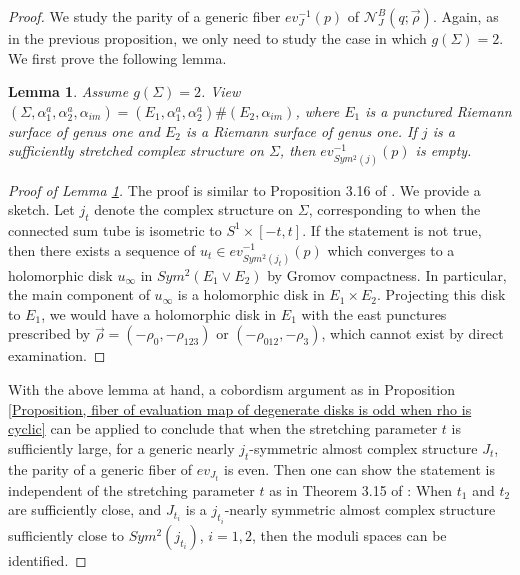 \documentclass{amsart}
\newtheorem{lem}[thm]{Lemma}
\theoremstyle{definition}
\theoremstyle{remark}
\numberwithin{equation}{section}
\numberwithin{equation}{section} \makeatletter
\begin{document}
\begin{proof}
We study the parity of a generic fiber $ev^{-1}_J(p)$ of $\mathcal{N}_J^B(q;\overrightarrow{\rho})$. Again, as in the previous proposition, we only need to study the case in which $g(\Sigma)=2$. We first prove the following lemma. 
\begin{lem}\label{Lemma, fiber of degenerate disk over sufficiently stretched complex structure, rho non-cyclic}
Assume $g(\Sigma)=2$. View $(\Sigma,\alpha_1^a,\alpha^a_2,\alpha_{im})=(E_1,\alpha_1^a,\alpha_2^a)\# (E_2,\alpha_{im})$, where $E_1$ is a punctured Riemann surface of genus one and $E_2$ is a Riemann surface of genus one. If $j$ is a sufficiently stretched complex structure on $\Sigma$, then $ev^{-1}_{Sym^2(j)}(p)$ is empty.
\end{lem}  
\begin{proof}[Proof of Lemma \ref{Lemma, fiber of degenerate disk over sufficiently stretched complex structure, rho non-cyclic}]
The proof is similar to Proposition 3.16 of \cite{OS04}. We provide a sketch. Let $j_t$ denote the complex structure on $\Sigma$, corresponding to when the connected sum tube is isometric to $S^1\times[-t,t]$. If the statement is not true, then there exists a sequence of $u_t\in ev^{-1}_{Sym^2(j_t)}(p)$ which converges to a holomorphic disk $u_{\infty}$ in $Sym^2(E_1\vee E_2)$ by Gromov compactness. In particular, the main component of $u_\infty$ is a holomorphic disk in $E_1\times E_2$. Projecting this disk to $E_1$, we would have a holomorphic disk in $E_1$ with the east punctures prescribed by $\overrightarrow{\rho}=(-\rho_0,-\rho_{123})$ or $(-\rho_{012},-\rho_{3})$, which cannot exist by direct examination. 
\end{proof}
With the above lemma at hand, a cobordism argument as in Proposition \ref{Proposition, fiber of evaluation map of degenerate disks is odd when rho is cyclic} can be applied to conclude that when the stretching parameter $t$ is sufficiently large, for a generic nearly $j_t$-symmetric almost complex structure $J_t$, the parity of a generic fiber of $ev_{J_t}$ is even. Then one can show the statement is independent of the stretching parameter $t$ as in Theorem 3.15 of \cite{OS04}: When $t_1$ and $t_2$ are sufficiently close, and $J_{t_i}$ is a $j_{t_i}$-nearly symmetric almost complex structure sufficiently close to $Sym^2(j_{t_i})$, $i=1,2$, then the moduli spaces can be identified. 
\end{proof}
\end{document}
